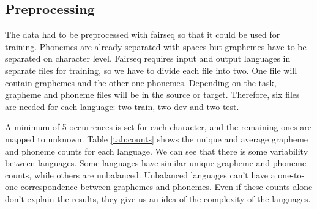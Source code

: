 \documentclass[11pt,a4paper]{article}
\begin{document}
\subsection{Preprocessing}

The data had to be preprocessed with fairseq so that it could be used for training. Phonemes are already separated with spaces but graphemes have to be separated on character level. Fairseq requires input and output languages in separate files for training, so we have to divide each file into two. One file will contain graphemes and the other one phonemes. Depending on the task, grapheme and phoneme files will be in the source or target. Therefore, six files are needed for each language: two train, two dev and two test.

A minimum of 5 occurrences is set for each character, and the remaining ones are mapped to unknown. Table \ref{tab:counts} shows the unique and average grapheme and phoneme counts for each language. We can see that there is some variability between languages. Some languages have similar unique grapheme and phoneme counts, while others are unbalanced. Unbalanced languages can't have a one-to-one correspondence between graphemes and phonemes. Even if these counts alone don't explain the results, they give us an idea of the complexity of the languages.
\end{document}

